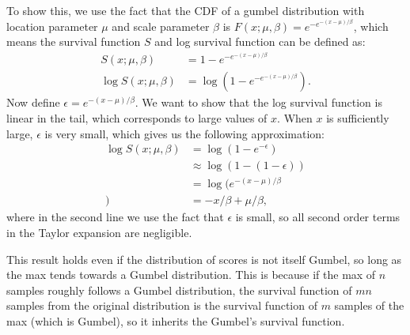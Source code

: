 To show this, we use the fact that the CDF of a gumbel distribution with location parameter $\mu$ and scale parameter $\beta$ is $F(x; \mu, \beta) = e^{-e^{-(x - \mu) / \beta}}$, which means the survival function $S$ and log survival function can be defined as:
\begin{align}
    S(x; \mu, \beta) &= 1 - e^{-e^{-(x - \mu) / \beta}} \\ 
    \log S(x; \mu, \beta) &= \log (1 - e^{-e^{-(x - \mu) / \beta}}). 
\end{align}
Now define $\epsilon = e^{-(x - \mu) / \beta}$. We want to show that the log survival function is linear in the tail, which corresponds to large values of $x$. When $x$ is sufficiently large, $\epsilon$ is very small, which gives us the following approximation:
\begin{align}
    \log S(x; \mu, \beta) &= \log (1 - e^{-\epsilon})\\
    &\approx \log (1 - (1 - \epsilon))\\
    &= \log (e^{-(x - \mu) / \beta}\\)
    &= -x / \beta + \mu / \beta,
\end{align}
where in the second line we use the fact that $\epsilon$ is small, so all second order terms in the Taylor expansion are negligible. 

This result holds even if the distribution of scores is not itself Gumbel, so long as the max tends towards a Gumbel distribution. This is because if the max of $n$ samples roughly follows a Gumbel distribution, the survival function of $mn$ samples from the original distribution is the survival function of $m$ samples of the max (which is Gumbel), so it inherits the Gumbel's survival function. 